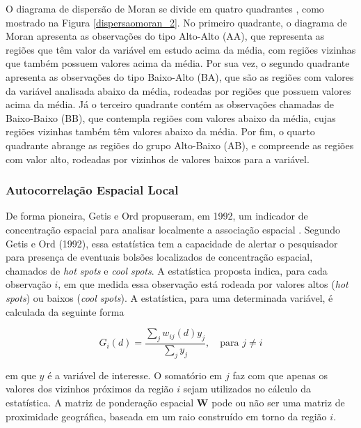 \documentclass[12pt,a4paper]{article}
\begin{document}
O diagrama de dispersão de Moran se divide em quatro quadrantes , como mostrado na Figura \ref{dispersaomoran_2}. No primeiro quadrante, o diagrama de Moran apresenta as observações do tipo Alto-Alto (AA), que representa as regiões que têm valor da variável em estudo acima da média, com regiões vizinhas que também possuem valores acima da média. Por sua vez, o segundo quadrante apresenta as observações do tipo Baixo-Alto (BA), que são as regiões com valores da variável analisada abaixo da média, rodeadas por regiões que possuem valores acima da média. Já o terceiro quadrante contém as observações chamadas de Baixo-Baixo (BB), que contempla regiões com valores abaixo da média, cujas regiões vizinhas também têm valores abaixo da média. Por fim, o quarto quadrante abrange as regiões do grupo  Alto-Baixo (AB), e compreende as regiões com valor alto, rodeadas por vizinhos de valores baixos para a variável.

	
\subsubsection{Autocorrelação Espacial Local}
	
	
De forma pioneira, Getis e Ord propuseram, em 1992, um indicador de concentração espacial para analisar localmente a associação espacial \cite{almeida12_2}. Segundo Getis e Ord (1992), essa estatística tem a capacidade de alertar o pesquisador para presença de eventuais bolsões localizados de concentração espacial, chamados de \textit{hot spots} e \textit{cool spots}. A estatística proposta indica, para cada observação $i$, em que medida essa observação está rodeada por valores altos (\textit{hot spots}) ou baixos (\textit{cool spots}). A estatística, para uma determinada variável, é calculada da seguinte forma 
	
\begin{equation}\label{g_getis_ord_l}
	G_i(d) = \dfrac{\sum_{j} w_{ij}(d) y_j}{\sum_{j}  y_j},\quad \text{para  $j \neq i$}
\end{equation}
	
\noindent em que $y$ é a variável de interesse. O somatório em $j$ faz com que apenas os valores dos vizinhos próximos da região $i$ sejam utilizados no cálculo da estatística. A matriz de ponderação espacial $\boldsymbol{W}$ pode ou não ser uma matriz de proximidade geográfica, baseada em um raio construído em torno da região $i$. 
	
\end{document}

